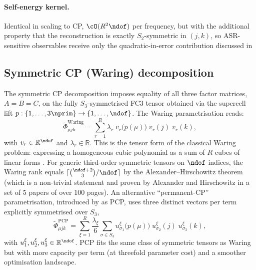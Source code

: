 \paragraph{Self-energy kernel.} Identical in scaling to CP, $\cO(R^{2}\ndof)$ per frequency, but
with the additional property that the reconstruction is exactly $S_2$-symmetric in $(j,k)$, so
ASR-sensitive observables receive only the quadratic-in-error contribution discussed in


\subsection{Symmetric CP (Waring) decomposition}
\label{sub:fc3_symcp}
The symmetric CP decomposition imposes equality of all three factor matrices, $A=B=C$, on the
fully $S_3$-symmetrised FC3 tensor obtained via the supercell lift
$p:\{1,\dots,3\nprim\}\to\{1,\dots,\ndof\}$. The Waring parametrisation reads:
\begin{equation}\label{eq:fc3_waring_ansatz}
    \tilde\Phi_{\mu j k}^{\mathrm{Waring}}
    = \sum_{r=1}^{R} \lambda_r\;
      v_r\!\bigl(p(\mu)\bigr)\; v_r(j)\; v_r(k),
\end{equation}
with $v_r\in\mathbb{R}^{\ndof}$ and $\lambda_r\in\mathbb{R}$. This is the tensor form of the
classical Waring problem: expressing a homogeneous cubic polynomial as a sum of $R$ cubes of
linear forms \cite{brachat_symmetric_2010, comon_symmetric_2008, oeding_eigenvectors_2013}. For
generic third-order symmetric tensors on $\ndof$ indices, the Waring rank equals
$\lceil\binom{\ndof+2}{3}/\ndof\rceil$ by the Alexander--Hirschowitz theorem
\cite{alexander_generic_1997} (which is a non-trivial statement and proven by Alexander and Hirschowitz
in a set of 5 papers of over 100 pages). An alternative ``permanent-CP'' parametrisation, introduced
by \citet{luo_tensor_2025} as PCP, uses three distinct vectors per term explicitly symmetrised
over $S_3$,
\begin{equation}\label{eq:fc3_pcp_ansatz}
    \tilde\Phi_{\mu j k}^{\mathrm{PCP}}
    = \sum_{\xi=1}^{R} \frac{\lambda_\xi}{6}
      \sum_{\sigma\in S_3}
      u^{\xi}_{\sigma_1}\!\bigl(p(\mu)\bigr)\;
      u^{\xi}_{\sigma_2}(j)\;
      u^{\xi}_{\sigma_3}(k),
\end{equation}
with $u^{\xi}_1, u^{\xi}_2, u^{\xi}_3\in\mathbb{R}^{\ndof}$. PCP fits the same class of symmetric
tensors as Waring but with more capacity per term (at threefold parameter cost) and a smoother
optimisation landscape.

